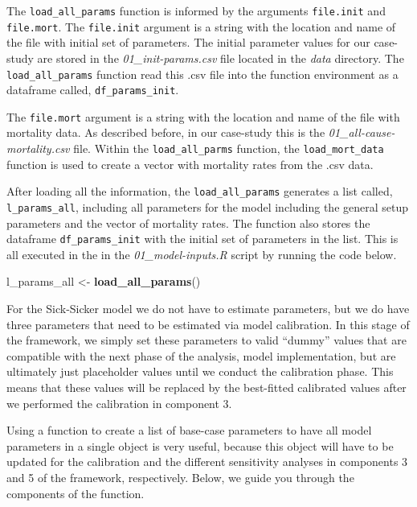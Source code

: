 \documentclass[]{book}
\newenvironment{Shaded}{\begin{snugshade}}{\end{snugshade}}
\newcommand{\KeywordTok}[1]{\textcolor[rgb]{0.13,0.29,0.53}{\textbf{#1}}}
\newcommand{\NormalTok}[1]{#1}
\newcommand{\StringTok}[1]{\textcolor[rgb]{0.31,0.60,0.02}{#1}}
\begin{document}
The \texttt{load\_all\_params} function is informed by the arguments \texttt{file.init} and \texttt{file.mort}. The \texttt{file.init} argument is a string with the location and name of the file with initial set of parameters. The initial parameter values for our case-study are stored in the \emph{01\_init-params.csv} file located in the \emph{data} directory. The \texttt{load\_all\_params} function read this .csv file into the function environment as a dataframe called, \texttt{df\_params\_init}.

The \texttt{file.mort} argument is a string with the location and name of the file with mortality data. As described before, in our case-study this is the \emph{01\_all-cause-mortality.csv} file. Within the \texttt{load\_all\_parms} function, the \texttt{load\_mort\_data} function is used to create a vector with mortality rates from the .csv data.

After loading all the information, the \texttt{load\_all\_params} generates a list called, \texttt{l\_params\_all}, including all parameters for the model including the general setup parameters and the vector of mortality rates. The function also stores the dataframe \texttt{df\_params\_init} with the initial set of parameters in the list. This is all executed in the in the \emph{01\_model-inputs.R} script by running the code below.

\begin{Shaded}
\begin{Highlighting}[]
\NormalTok{l_params_all <-}\StringTok{ }\KeywordTok{load_all_params}\NormalTok{()}
\end{Highlighting}
\end{Shaded}

For the Sick-Sicker model we do not have to estimate parameters, but we do have three parameters that need to be estimated via model calibration. In this stage of the framework, we simply set these parameters to valid ``dummy'' values that are compatible with the next phase of the analysis, model implementation, but are ultimately just placeholder values until we conduct the calibration phase. This means that these values will be replaced by the best-fitted calibrated values after we performed the calibration in component 3.

Using a function to create a list of base-case parameters to have all model parameters in a single object is very useful, because this object will have to be updated for the calibration and the different sensitivity analyses in components 3 and 5 of the framework, respectively. Below, we guide you through the components of the function.
\end{document}
